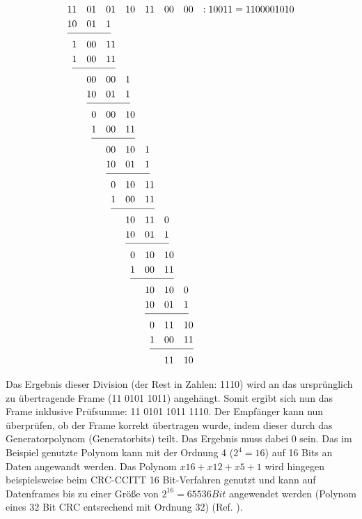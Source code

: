 \begin{figure}[H]
\jot-0.6mm
\begin{alignat*}{14}
1&1&0&1&0&1&1&0&1&1&0&0&0&0& : 10011=1100001010 \\
1&0&0&1&1\\ \cline{1-5}
&1&0&0&1&1& \\ 
&1&0&0&1&1& \\ \cline{2-6}
&&0&0&0&0&1& \\ 
&&1&0&0&1&1& \\ \cline{3-7}
&&&0&0&0&1&0& \\                                                 
&&&1&0&0&1&1& \\ \cline{4-8}
&&&&0&0&1&0&1& \\                                               
&&&&1&0&0&1&1& \\ \cline{5-9}
&&&&&0&1&0&1&1& \\                                           
&&&&&1&0&0&1&1&  \\ \cline{6-10}                                                                                  
&&&&&&1&0&1&1&0& \\                                           
&&&&&&1&0&0&1&1& \\   \cline{7-11}                                                                                      
&&&&&&&0&1&0&1&0& \\                                         
&&&&&&&1&0&0&1&1& \\ \cline{8-12}                                                                                     
&&&&&&&&1&0&1&0&0& \\                                       
&&&&&&&&1&0&0&1&1& \\ \cline{9-13}                                                                               
&&&&&&&&&0&1&1&1&0& \\                                     
&&&&&&&&&1&0&0&1&1& \\ \cline{10-14}    
&&&&&&&&&&1&1&1&0& 
\end{alignat*}
\end{figure}

Das Ergebnis dieser Division (der Rest in Zahlen: 1110) wird an das
urspr{\"u}nglich zu {\"u}bertragende Frame (11 0101 1011) angeh{\"a}ngt. Somit ergibt sich
nun das Frame inklusive Pr{\"u}fsumme: 11 0101 1011 1110. Der
Empf{\"a}nger kann nun {\"u}berpr{\"u}fen, ob der Frame korrekt {\"u}bertragen
wurde, indem dieser durch das Generatorpolynom (Generatorbits) teilt. Das
Ergebnis muss dabei 0 sein. Das im Beispiel genutzte Polynom kann mit der Ordnung 4
($2^4=16$) auf 16 Bits an Daten angewandt werden. Das Polynom $x16+x12+x5+1$
wird hingegen beispielsweise beim CRC-CCITT 16 Bit-Verfahren genutzt und
kann auf Datenframes bis zu einer Gr{\"o}{\ss}e von $2^{16}=65536 Bit$
angewendet werden (Polynom eines 32 Bit CRC entsrechend mit Ordnung 32) (Ref. \cite{web2}).

